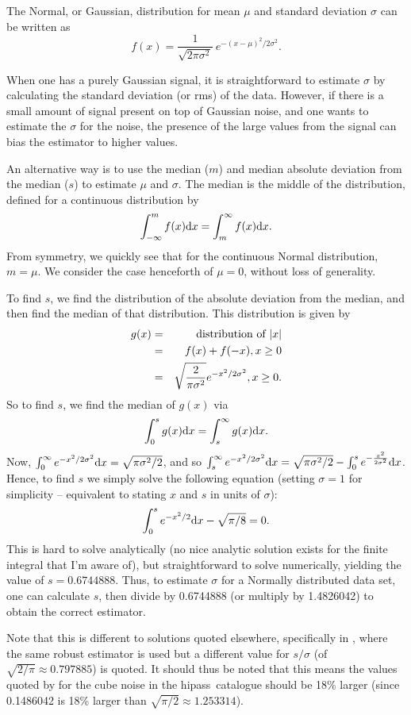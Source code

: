 \documentclass[12pt]{article}
\newcommand{\hipass}{{\sc hipass}}
\newcommand{\diff}{{\rm d}}
\begin{document}
The Normal, or Gaussian, distribution for mean $\mu$ and standard
deviation $\sigma$ can be written as 
\[ 
f(x) = \frac{1}{\sqrt{2\pi\sigma^2}}\ e^{-(x-\mu)^2/2\sigma^2}.
 \]

When one has a purely Gaussian signal, it is straightforward to
estimate $\sigma$ by calculating the standard deviation (or rms) of
the data. However, if there is a small amount of signal present on top
of Gaussian noise, and one wants to estimate the $\sigma$ for the
noise, the presence of the large values from the signal can bias the
estimator to higher values.

An alternative way is to use the median ($m$) and median absolute deviation
from the median ($s$) to estimate $\mu$ and $\sigma$. The median is the
middle of the distribution, defined for a continuous distribution by
\[
\int_{-\infty}^{m} f(x) \diff x = \int_{m}^{\infty} f(x) \diff x.
\]
From symmetry, we quickly see that for the continuous Normal
distribution, $m=\mu$. We consider the case henceforth of $\mu=0$,
without loss of generality.

To find $s$, we find the distribution of the absolute deviation from
the median, and then find the median of that distribution. This
distribution is given by
\begin{eqnarray*}
g(x) &= &{\mbox{\rm distribution of }} |x|\\
     &= &f(x) + f(-x), x\ge0\\
     &= &\sqrt{\frac{2}{\pi\sigma^2}} e^{-x^2/2\sigma^2}, x\ge0.
\end{eqnarray*}
So to find $s$, we find the median of $g(x)$ via
\[
\int_{0}^{s} g(x) \diff x = \int_{s}^{\infty} g(x) \diff x.
\]
Now, $\int_{0}^{\infty}e^{-x^2/2\sigma^2} \diff x = \sqrt{\pi\sigma^2/2}$, and
so $\int_{s}^{\infty} e^{-x^2/2\sigma^2} \diff x =
\sqrt{\pi\sigma^2/2} - \int_{0}^{s} e^{-\frac{x^2}{2\sigma^2}} \diff x
$. Hence, to find $s$ we simply solve the following equation (setting $\sigma=1$ for
simplicity -- equivalent to stating $x$ and $s$ in units of $\sigma$):
\[
\int_{0}^{s}e^{-x^2/2} \diff x - \sqrt{\pi/8} = 0.
\]
This is hard to solve analytically (no nice analytic solution exists
for the finite integral that I'm aware of), but straightforward to
solve numerically, yielding the value of $s=0.6744888$. Thus, to
estimate $\sigma$ for a Normally distributed data set, one can calculate
$s$, then divide by 0.6744888 (or multiply by 1.4826042) to obtain the
correct estimator.

Note that this is different to solutions quoted elsewhere,
specifically in \citet{meyer04:trunc}, where the same robust estimator is
used but a different value for $s/\sigma$ (of
$\sqrt{2/\pi}\approx0.797885$) is quoted. It should thus be noted that
this means the values quoted by \citet{meyer04:trunc} for the cube noise in
the \hipass\ catalogue should be 18\% larger (since 0.1486042 is 18\%
larger than $\sqrt{\pi/2}\approx1.253314$). 
\end{document}
